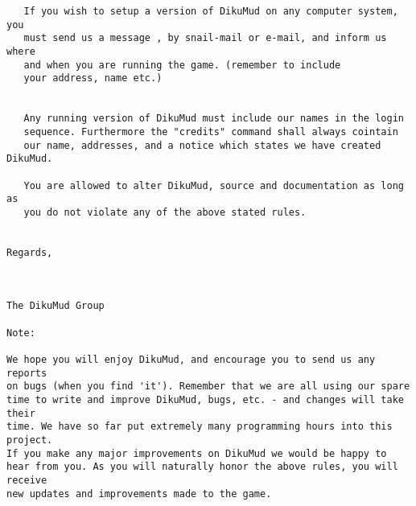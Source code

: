 \documentclass[11pt]{article}
\begin{document}
\begin{verbatim}
   If you wish to setup a version of DikuMud on any computer system, you
   must send us a message , by snail-mail or e-mail, and inform us where
   and when you are running the game. (remember to include 
   your address, name etc.)


   Any running version of DikuMud must include our names in the login
   sequence. Furthermore the "credits" command shall always cointain
   our name, addresses, and a notice which states we have created DikuMud.

   You are allowed to alter DikuMud, source and documentation as long as
   you do not violate any of the above stated rules.


Regards,



The DikuMud Group

Note:

We hope you will enjoy DikuMud, and encourage you to send us any reports
on bugs (when you find 'it'). Remember that we are all using our spare
time to write and improve DikuMud, bugs, etc. - and changes will take their
time. We have so far put extremely many programming hours into this project.
If you make any major improvements on DikuMud we would be happy to
hear from you. As you will naturally honor the above rules, you will receive
new updates and improvements made to the game.

\end{verbatim}
\end{document}
